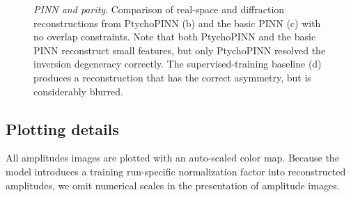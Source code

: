 \documentclass[sn-mathphys]{sn-jnl}%
\theoremstyle{thmstyleone}%
\theoremstyle{thmstyletwo}%
\theoremstyle{thmstylethree}%
\begin{document}
\begin{figure}
    \centering
    \caption{\emph{PINN and parity}. Comparison of real-space and diffraction reconstructions from PtychoPINN (b) and the basic PINN (c) with no overlap constraints. Note that both PtychoPINN and the basic PINN reconstruct small features, but only PtychoPINN resolved the inversion degeneracy correctly. The supervised-training baseline (d) produces a reconstruction that has the correct asymmetry, but is considerably blurred.}%
    \label{fig:patches}
\end{figure}

\subsection{Plotting details}
All amplitudes images are plotted with an auto-scaled color map. Because the model introduces a training run-specific normalization factor into reconstructed amplitudes, we omit numerical scales in the presentation of amplitude images.
\end{document}
